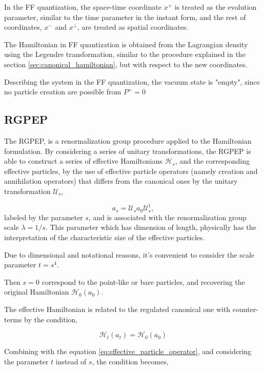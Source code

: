 \documentclass[11pt,a4paper,twoside,pdf]{article}
\numberwithin{equation}{section}
\begin{document}
In the FF quantization, the space-time coordinate $x^+$ is treated as the evolution 
parameter, similar to the time parameter in the instant form, and the rest of 
coordinates, $x^-$ and $x^\perp$, are treated as spatial coordinates.

The Hamiltonian in FF quantization is obtained from the Lagrangian density using 
the Legendre transformation, similar to the procedure explained in the section
\ref{sec:canonical_hamiltonian}, but with respect to the new coordinates.

Describing the system in the FF quantization, the vacuum state is "empty", since 
no particle creation are possible from $P^+ = 0$

\subsection{RGPEP}
The RGPEP, is a renormalization group procedure applied to the Hamiltonian 
formulation. By considering a series of unitary transformations, the RGPEP is able to construct a 
series of effective Hamiltonians $\mathcal{H}_s$, and the corresponding effective 
particles, by the use of effective particle operators (namely creation and 
annihilation operators) that differs from the canonical ones by the unitary 
transformation $\mathcal{U}_s$,

\begin{equation}
    a_s = \mathcal{U}_sa_0\mathcal{U}_s^\dagger,
    \label{eq:effective_particle_operator}
\end{equation}
labeled by the parameter $s$, and is associated with the renormalization group scale
$\lambda = 1/s$. This parameter which has dimension of length, physically has the 
interpretation of the characteristic size of the effective particles.

Due to dimensional and notational reasons, it's convenient to consider the scale 
parameter $t = s^4$.

Then $s=0$ correspond to the point-like or bare particles, and recovering the 
original Hamiltonian $\mathcal{H}_0(a_0)$.

The effective Hamiltonian is related to the regulated canonical one with counter-terms 
by the condition,

\begin{equation}
    \mathcal{H}_t(a_t) = \mathcal{H}_0(a_0)
\end{equation}

Combining with the equation \eqref{eq:effective_particle_operator}, and considering 
the parameter $t$ instead of $s$, the condition becomes,
\end{document}
